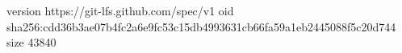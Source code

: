 version https://git-lfs.github.com/spec/v1
oid sha256:cdd36b3ae07b4fc2a6e9fc53c15db4993631cb66fa59a1eb2445088f5c20d744
size 43840
